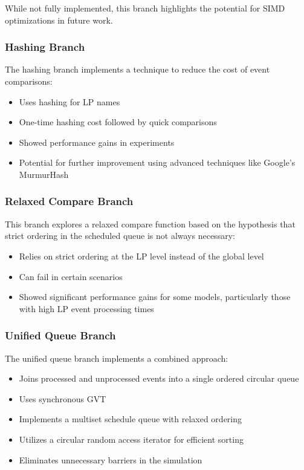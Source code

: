 While not fully implemented, this branch highlights the potential for SIMD optimizations in future work.

\subsubsection{Hashing Branch}

The hashing branch implements a technique to reduce the cost of event comparisons:

\begin{itemize}
    \item Uses hashing for LP names
    \item One-time hashing cost followed by quick comparisons
    \item Showed performance gains in experiments
    \item Potential for further improvement using advanced techniques like Google's MurmurHash
\end{itemize}

\subsubsection{Relaxed Compare Branch}

This branch explores a relaxed compare function based on the hypothesis that strict ordering in the scheduled queue is not always necessary:

\begin{itemize}
    \item Relies on strict ordering at the LP level instead of the global level
    \item Can fail in certain scenarios
    \item Showed significant performance gains for some models, particularly those with high LP event processing times
\end{itemize}

\subsubsection{Unified Queue Branch}

The unified queue branch implements a combined approach:

\begin{itemize}
    \item Joins processed and unprocessed events into a single ordered circular queue
    \item Uses synchronous GVT
    \item Implements a multiset schedule queue with relaxed ordering
    \item Utilizes a circular random access iterator for efficient sorting
    \item Eliminates unnecessary barriers in the simulation
\end{itemize}

